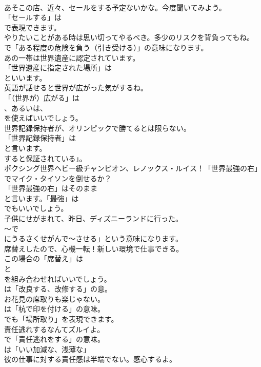 \documentclass[8pt]{extreport}
\begin{document}
\begin{CJK}{UTF8}{min}
\\	あそこの店、近々、セールをする予定ないかな。今度聞いてみよう。 
\\	「セールする」は 
\\	で表現できます。	
\\	やりたいことがある時は思い切ってやるべき。多少のリスクを背負ってもね。 
\\	で「ある程度の危険を負う（引き受ける）」の意味になります。	
\\	あの一帯は世界遺産に認定されています。 
\\	「世界遺産に指定された場所」は
\\	といいます。	
\\	英語が話せると世界が広がった気がするね。 
\\	「（世界が）広がる」は
\\	、あるいは、
\\	を使えばいいでしょう。	
\\	世界記録保持者が、オリンピックで勝てるとは限らない。 
\\	「世界記録保持者」は
\\	と言います。
\\	すると保証されている」。	
\\	ボクシング世界ヘビー級チャンピオン、レノックス・ルイス！「世界最強の右」でマイク・タイソンを倒せるか？ 
\\	「世界最強の右」はそのまま 
\\	と言います。「最強」は 
\\	でもいいでしょう。	
\\	子供にせがまれて、昨日、ディズニーランドに行った。 
\\	～で
\\	にうるさくせがんで～させる」という意味になります。	
\\	席替えしたので、心機一転！新しい環境で仕事できる。 
\\	この場合の「席替え」は
\\	と
\\	を組み合わせればいいでしょう。
\\	は「改良する、改修する」の意。	
\\	お花見の席取りも楽じゃない。 
\\	は「杭で印を付ける」の意味。
\\	でも「場所取り」を表現できます。	
\\	責任逃れするなんてズルイよ。 
\\	で「責任逃れをする」の意味。
\\	は「いい加減な、浅薄な」	
\\	彼の仕事に対する責任感は半端でない。感心するよ。 

\end{CJK}
\end{document}
